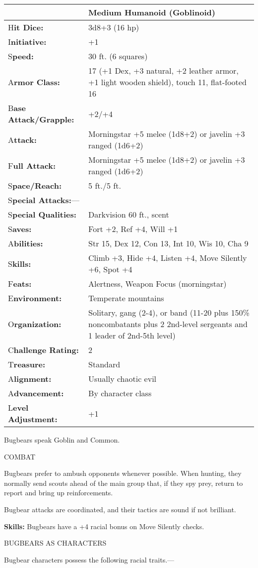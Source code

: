 \documentclass{article}
\begin{document}
\begin{tabular}{|>{\raggedright}p{85pt}|>{\raggedright}p{240pt}|}
\hline
  & Medium Humanoid (Goblinoid)\tabularnewline
\hline
H\textbf{it Dice:} & 3d8+3 (16 hp)\tabularnewline
\hline
I\textbf{nitiative:} & +1\tabularnewline
\hline
S\textbf{peed:} & 30 ft. (6 squares)\tabularnewline
\hline
A\textbf{rmor Class:} & 17 (+1 Dex, +3 natural, +2 leather armor, +1 light wooden 
shield), touch 11, flat-footed 16\tabularnewline
\hline
B\textbf{ase Attack/Grapple:} & +2/+4\tabularnewline
\hline
A\textbf{ttack:} & Morningstar +5 melee (1d8+2) or javelin +3 ranged (1d6+2)\tabularnewline
\hline
F\textbf{ull Attack:} & Morningstar +5 melee (1d8+2) or javelin +3 ranged (1d6+2)\tabularnewline
\hline
S\textbf{pace/Reach:} & 5 ft./5 ft.\tabularnewline
\hline
S\textbf{pecial Attacks:}--- & \tabularnewline
\hline
S\textbf{pecial Qualities:} & Darkvision 60 ft., scent\tabularnewline
\hline
S\textbf{aves:} & Fort +2, Ref +4, Will +1\tabularnewline
\hline
A\textbf{bilities:} & Str 15, Dex 12, Con 13, Int 10, Wis 10, Cha 9\tabularnewline
\hline
S\textbf{kills:} & Climb +3, Hide +4, Listen +4, Move Silently +6, Spot +4\tabularnewline
\hline
F\textbf{eats:} & Alertness, Weapon Focus (morningstar)\tabularnewline
\hline
E\textbf{nvironment:} & Temperate mountains\tabularnewline
\hline
O\textbf{rganization:} & Solitary, gang (2-4), or band (11-20 plus 150\% noncombatants 
plus 2 2nd-level sergeants and 1 leader of 2nd-5th level)\tabularnewline
\hline
C\textbf{hallenge Rating:} & 2\tabularnewline
\hline
T\textbf{reasure:} & Standard\tabularnewline
\hline
A\textbf{lignment:} & Usually chaotic evil\tabularnewline
\hline
A\textbf{dvancement:} & By character class\tabularnewline
\hline
L\textbf{evel Adjustment:} & +1\tabularnewline
\hline
\end{tabular}

Bugbears speak Goblin and Common.

COMBAT

Bugbears prefer to ambush opponents whenever possible. When hunting, they normally 
send scouts ahead of the main group that, if they spy prey, return to report and 
bring up reinforcements.

Bugbear attacks are coordinated, and their tactics are sound if not brilliant.

\textbf{Skills: }Bugbears have a +4 racial bonus on Move Silently checks.

BUGBEARS AS CHARACTERS

Bugbear characters possess the following racial traits.--- 
\end{document}
